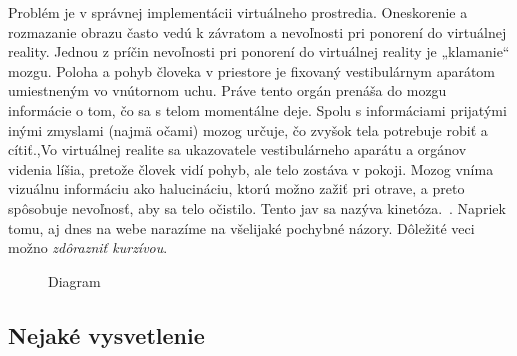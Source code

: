 \documentclass[10pt,twoside,slovak,a4paper]{article}
\begin{document}
 Problém je v správnej implementácii virtuálneho prostredia. Oneskorenie a rozmazanie obrazu často vedú k závratom a nevoľnosti pri ponorení do virtuálnej reality.  Jednou z príčin nevoľnosti pri ponorení do virtuálnej reality je „klamanie“ mozgu. Poloha a pohyb človeka v priestore je fixovaný vestibulárnym aparátom umiestneným vo vnútornom uchu. Práve tento orgán prenáša do mozgu informácie o tom, čo sa s telom momentálne deje. Spolu s informáciami prijatými inými zmyslami (najmä očami) mozog určuje, čo zvyšok tela potrebuje robiť a cítiť.\cite{Coplien:MPD},Vo virtuálnej realite sa ukazovatele vestibulárneho aparátu a orgánov videnia líšia, pretože človek vidí pohyb, ale telo zostáva v pokoji. Mozog vníma vizuálnu informáciu ako halucináciu, ktorú možno zažiť pri otrave, a preto spôsobuje nevoľnosť, aby sa telo očistilo. Tento jav sa nazýva kinetóza.~\cite{Czarnecki:Staged, Czarnecki:Progress}. Napriek tomu, aj dnes na webe narazíme na všelijaké pochybné názory\cite{PLP-Framework}. Dôležité veci možno \emph{zdôrazniť kurzívou}.
\begin{figure}[h]
	\centering
	\caption{Diagram}
	\label{framework}
\end{figure}


\subsection{Nejaké vysvetlenie} \label{ina:nejake}
\end{document}
